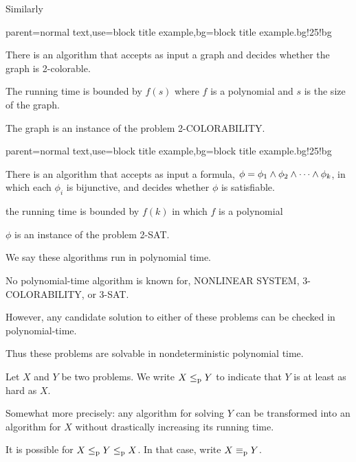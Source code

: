 \documentclass[12pt,xcolor=dvipsnames%
]{beamer}
\newcommand{\bigpause}{\pause\bigskip}
\renewcommand{\.}{\cdot}
\newcommand{\reduc}{\leq_{\text{\textnormal{p}}}}
\newcommand{\equivp}{\equiv_{\text{\textnormal{p}}}}
\let\emph=\alert
\begin{document}
\begin{frame}
  Similarly

  {parent=normal text,use=block title example,bg=block title example.bg!25!bg}
  \begin{exampleblock}{}
    There is an algorithm that accepts as input a graph and decides
    whether the graph is 2-colorable.

    \smallskip
    The running time is bounded by $f(s)$ where $f$ is a polynomial and
    $s$ is the size of the graph.
  \end{exampleblock}

  The graph is an instance of the problem 2-COLORABILITY.
\end{frame}

\begin{frame}
%
  {parent=normal text,use=block title example,bg=block title example.bg!25!bg}
  \begin{exampleblock}{}
  There is an algorithm that accepts as input a formula, $\phi = \phi_1 \wedge \phi_2 \wedge \cdots \wedge \phi_k$, in which each $\phi_i$ is bijunctive, and decides whether $\phi$ is satisfiable.
  
  \smallskip
  the running time is bounded by $f(k)$ in which $f$ is a polynomial
  \end{exampleblock}
  
  $\phi$ is an instance of the problem 2-SAT.

\bigpause
  We say these algorithms run in \emph{polynomial time}.
\end{frame}

\begin{frame}
  No polynomial-time algorithm is known for, NONLINEAR SYSTEM,
  3-COLORABILITY, or 3-SAT.

  \bigpause
  However, any candidate solution to either of these problems can be
  checked in polynomial-time. 

  \bigpause
  Thus these problems are solvable in \emph{nondeterministic polynomial
    time.} 
\end{frame}

\begin{frame}
  Let $X$ and $Y$ be two problems. We write $X \reduc Y$ to indicate that
  $Y$ is at least as hard as $X$.

  \bigpause
  Somewhat more precisely: any algorithm for solving $Y$ can be
  transformed into an algorithm for $X$ without drastically increasing
  its running time.

  \bigpause
  It is possible for $X\reduc Y \reduc X$. In that case, write $X\equivp
  Y$. 

\end{frame}
\end{document}
